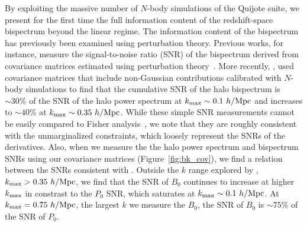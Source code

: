 By exploiting the massive number of $N$-body simulations of the Quijote 
suite, we present for the first time the full information content of the 
redshift-space bispectrum beyond the linear regime. The information content 
of the bispectrum has previously been examined using perturbation 
theory. Previous works, for instance, measure the signal-to-noise ratio (SNR) 
of the bispectrum derived from covariance matrices estimated using perturbation 
theory~\citep{sefusatti2005, sefusatti2006, chan2017}. More recently, \cite{chan2017},
used covariance matrices that include non-Gaussian contributions calibrated with 
$N$-body simulations to find that the cumulative SNR of the halo bispectrum is 
$\sim 30\%$ of the SNR of the halo power spectrum at $k_{\rm max} \sim 0.1~h/{\rm Mpc}$ 
and increases to $\sim 40\%$ at $k_{\rm max}\sim 0.35~h/{\rm Mpc}$. While these simple 
SNR measurements cannot be easily compared to Fisher analysis~\citep{repp2015, blot2016}, 
we note that they are roughly consistent with the unmarginalized constraints, 
which loosely represent the SNRs of the derivatives. 
Also, when we measure the the halo power spectrum and bispectrum SNRs using our 
covariance matrices (Figure~\ref{fig:bk_cov}), we find a relation between the 
SNRs consistent with \cite{chan2017}. Outside the $k$ range explored by \cite{chan2017},  
$k_{\rm max}>0.35~h/{\rm Mpc}$, we find that the SNR of $B_0$ continues to increase 
at higher $k_{\rm max}$ in constrast to the $P_0$ SNR, which saturates at 
$k_{\rm max}\sim 0.1~h/{\rm Mpc}$. At $k_{\rm max} = 0.75~h/{\rm Mpc}$, the largest $k$ we 
measure the $B_0$, the SNR of $B_0$ is $\sim75\%$ of the SNR of $P_0$.

